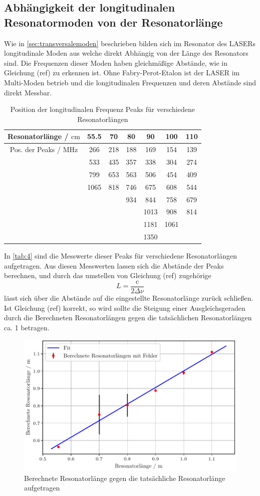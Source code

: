 \subsection{Abhängigkeit der longitudinalen Resonatormoden von der Resonatorlänge}
Wie in \autoref{sec:transversalemoden} beschrieben bilden sich im Resonator des LASERs longitudinale Moden aus welche direkt Abhängig von der Länge des Resonators sind. Die Frequenzen dieser Moden haben gleichmäßige Abstände, wie in Gleichung (ref) zu erkennen ist.
Ohne Fabry-Perot-Etalon ist der LASER im Multi-Moden betrieb und die longitudinalen Frequenzen und deren Abstände sind direkt Messbar. 
\begin{table}[H]
  \centering
  \caption{Position der longitudinalen Frequenz Peaks für verschiedene Resonatorlängen}
  \begin{tabular}{S ||S| S| S| S| S| S}
      \toprule
      {Resonatorlänge / $\mathrm{cm}$} & {55.5} & {70}  & {80} & {90} & {100}  & {110}\\
      \midrule
      {Pos. der Peaks / $\mathrm{MHz}$} & 266 & 218& 188& 169& 154& 139\\
       &533 & 435 & 357 & 338 & 304 & 274 \\
       &799 & 653 & 563 & 506 & 454 & 409 \\
       &1065 & 818 & 746 & 675 & 608 & 544 \\
       & & &934 & 844 & 758 & 679 \\
       & & & &1013 & 908 & 814 \\
       & & & & 1181 & 1061 & \\
       & & & & 1350 & & \\
      \bottomrule
  \end{tabular}
  \label{tab:4}
\end{table}
\noindent 
In \autoref{tab:4} sind die Messwerte dieser Peaks für verschiedene Resonatorlängen aufgetragen. Aus diesen Messwerten lassen sich die Abstände der Peaks berechnen, und durch das umstellen von Gleichung (ref) zugehörige
\begin{equation}
  L = \frac{\text{c}}{2 \Delta \nu}
\end{equation}
lässt sich über die Abstände auf die eingestellte Resonatorlänge zurück schließen. Ist Gleichung (ref) korrekt, so wird sollte die Steigung einer Ausgleichsgeraden durch die Berechneten Resonatorlängen gegen die tatsächlichen Resonatorlängen ca. 1 betragen.
\begin{figure}[H]
  \centering
  \includegraphics[width=0.65\linewidth]{plots/long_mode.pdf}
  \caption{Berechnete Resonatorlänge gegen die tatsächliche Resonatorlänge aufgetragen}
  \label{fig:3}
\end{figure}
